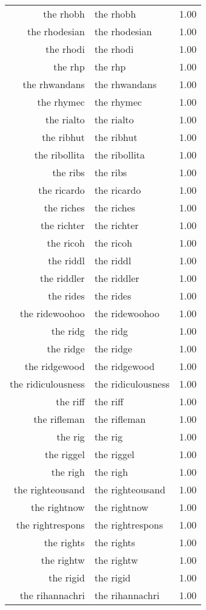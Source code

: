 \begin{table}[ht]
\begin{tabular}{rlr}
  the rhobh & the rhobh & 1.00 \\ 
  the rhodesian & the rhodesian & 1.00 \\ 
  the rhodi & the rhodi & 1.00 \\ 
  the rhp & the rhp & 1.00 \\ 
  the rhwandans & the rhwandans & 1.00 \\ 
  the rhymec & the rhymec & 1.00 \\ 
  the rialto & the rialto & 1.00 \\ 
  the ribhut & the ribhut & 1.00 \\ 
  the ribollita & the ribollita & 1.00 \\ 
  the ribs & the ribs & 1.00 \\ 
  the ricardo & the ricardo & 1.00 \\ 
  the riches & the riches & 1.00 \\ 
  the richter & the richter & 1.00 \\ 
  the ricoh & the ricoh & 1.00 \\ 
  the riddl & the riddl & 1.00 \\ 
  the riddler & the riddler & 1.00 \\ 
  the rides & the rides & 1.00 \\ 
  the ridewoohoo & the ridewoohoo & 1.00 \\ 
  the ridg & the ridg & 1.00 \\ 
  the ridge & the ridge & 1.00 \\ 
  the ridgewood & the ridgewood & 1.00 \\ 
  the ridiculousness & the ridiculousness & 1.00 \\ 
  the riff & the riff & 1.00 \\ 
  the rifleman & the rifleman & 1.00 \\ 
  the rig & the rig & 1.00 \\ 
  the riggel & the riggel & 1.00 \\ 
  the righ & the righ & 1.00 \\ 
  the righteousand & the righteousand & 1.00 \\ 
  the rightnow & the rightnow & 1.00 \\ 
  the rightrespons & the rightrespons & 1.00 \\ 
  the rights & the rights & 1.00 \\ 
  the rightw & the rightw & 1.00 \\ 
  the rigid & the rigid & 1.00 \\ 
  the rihannachri & the rihannachri & 1.00 \\ 

\end{tabular}
\end{table}
